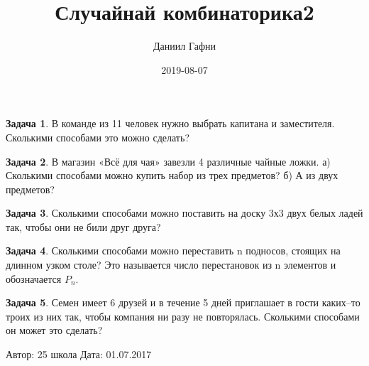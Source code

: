 \documentclass[a4paper,11pt]{article}%
\title{Случайнай комбинаторика2}%
\author{Даниил Гафни}%
\date{2019{-}08{-}07}%
\theoremstyle{definition}%
\newtheorem{Ex}{\hspace{-25pt}\fbox{\phantom{123}} Задача}%
\begin{document}
%
\normalsize%
\maketitle%
\begin{Ex}%
В команде из 11 человек нужно выбрать капитана и заместителя. Сколькими способами это можно сделать?%
%
\end{Ex}%
%
\iffalse%
Автор: Ираклий Гагуа\newline%
%
Дата: 07.01.2011\newline%
%
Название: \newline%
%
Подсказка: \textbackslash{}\textbackslash{}%
nan%
\fi%
%
\begin{Ex}%
В магазин «Всё для чая» завезли 4 различные чайные ложки.
а) Сколькими способами можно купить набор из трех предметов?
б) А из двух предметов?%
%
\end{Ex}%
%
\iffalse%
Автор: Ираклий Гагуа\newline%
%
Дата: 07.01.2011\newline%
%
Название: \newline%
%
Подсказка: \textbackslash{}\textbackslash{}%
nan%
\fi%
%
\begin{Ex}%
Сколькими способами можно поставить на доску 3х3 двух белых ладей так, чтобы они не били друг друга?%
%
\end{Ex}%
%
\iffalse%
Автор: Ираклий Гагуа\newline%
%
Дата: 07.01.2011\newline%
%
Название: \newline%
%
Подсказка: \textbackslash{}\textbackslash{}%
nan%
\fi%
%
\begin{Ex}%
Сколькими способами можно переставить n подносов, стоящих на длинном узком столе? Это называется число перестановок из n элементов и обозначается $P_n$.%
%
\end{Ex}%
%
\iffalse%
Автор: Ираклий Гагуа\newline%
%
Дата: 07.01.2011\newline%
%
Название: \newline%
%
Подсказка: \textbackslash{}\textbackslash{}%
nan%
\fi%
%
\begin{Ex}%
Семен имеет 6 друзей и в течение 5 дней приглашает в гости каких–то троих
из них так, чтобы компания ни разу не повторялась. Сколькими способами он может
это сделать?%
%
\end{Ex}%
%
\iffalse%
Автор: 25 школа\newline%
%
Дата: 01.07.2017\newline%
\end{document}
